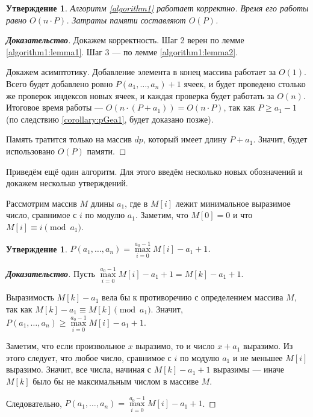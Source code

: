 \documentclass[12pt]{article}
\newtheorem{proposition}[theorem]{Утверждение}
\begin{document}
\begin{proposition}
Алгоритм \ref{algorithm1} работает корректно. Время его работы равно $O(n \cdot P)$. Затраты памяти составляют $O(P)$.
\end{proposition}
\begin{proof}[\textbf{Доказательство}]
Докажем корректность. Шаг 2 верен по лемме \ref{algorithm1:lemma1}. Шаг 3 --- по лемме \ref{algorithm1:lemma2}.

Докажем асимптотику. Добавление элемента в конец массива работает за $O(1)$. Всего будет добавлено ровно $P(a_1, \dots , a_n) + 1$ ячеек, и будет проведено столько же проверок индексов новых ячеек, и каждая проверка будет работать за $O(n)$. Итоговое время работы --- $O(n \cdot (P + a_1)) = O(n \cdot P)$, так как $P \ge a_1 - 1$ (по следствию \ref{corollary:pGea1}, будет доказано позже).

Память тратится только на массив $dp$, который имеет длину $P + a_1$. Значит, будет использовано $O(P)$ памяти.
\end{proof}

Приведём ещё один алгоритм. Для этого введём несколько новых обозначений и докажем несколько утверждений.

Рассмотрим массив $M$ длины $a_1$, где в $M[i]$ лежит минимальное выразимое число, сравнимое с $i$ по модулю $a_1$. Заметим, что $M[0] = 0$ и что $M[i] \equiv i \pmod {a_1}$.

\begin{proposition}
\label{algorithm2:lemma1}
$P(a_1, \dots, a_n) = \max\limits_{i = 0}^{a_0 - 1} M[i] - a_1 + 1$.
\end{proposition}
\begin{proof}[\textbf{Доказательство}]
Пусть $\max\limits_{i = 0}^{a_0 - 1} M[i] - a_1 + 1 = M[k] - a_1 + 1$.

Выразимость $M[k] - a_1$ вела бы к противоречию с определением массива $M$, так как $M[k] - a_1 \equiv M[k] \pmod {a_1}$. Значит, $P(a_1, \dots, a_n) \ge \max\limits_{i = 0}^{a_0 - 1} M[i] - a_1 + 1$.

Заметим, что если произвольное $x$ выразимо, то и число $x + a_1$ выразимо. Из этого следует, что любое число, сравнимое с $i$ по модулю $a_1$ и не меньшее $M[i]$ выразимо. Значит, все числа, начиная с $M[k] - a_1 + 1$ выразимы --- иначе $M[k]$ было бы не максимальным числом в массиве $M$.

Следовательно, $P(a_1, \dots, a_n) = \max\limits_{i = 0}^{a_0 - 1} M[i] - a_1 + 1$.
\end{proof}
\end{document}
